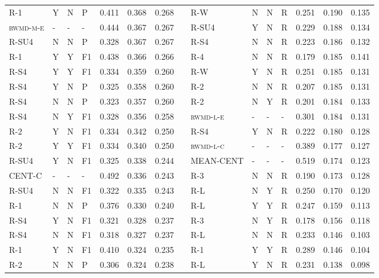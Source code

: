 \documentclass[11pt,a4paper]{article}
\begin{document}
\begin{table}[]
{\begin{tabular}{lllllllllllllll}
\textsc{R-1} & Y & N & P & 0.411 & 0.368 & 0.268 &  & \textsc{R-W} & N & N & R & 0.251 & 0.190 & 0.135 \\
\textsc{rwmd-m-e} & - & - & - & 0.444 & 0.367 & 0.267 &  & \textsc{R-SU4} & Y & N & R & 0.229 & 0.188 & 0.134 \\
\textsc{R-SU4} & N & N & P & 0.328 & 0.367 & 0.267 &  & \textsc{R-S4} & N & N & R & 0.223 & 0.186 & 0.132 \\
\textsc{R-1} & Y & Y & F1 & 0.438 & 0.366 & 0.266 &  & \textsc{R-4} & N & N & R & 0.179 & 0.185 & 0.141 \\
\textsc{R-S4} & Y & Y & F1 & 0.334 & 0.359 & 0.260 &  & \textsc{R-W} & Y & N & R & 0.251 & 0.185 & 0.131 \\
\textsc{R-S4} & Y & N & P & 0.325 & 0.358 & 0.260 &  & \textsc{R-2} & N & N & R & 0.207 & 0.185 & 0.131 \\
\textsc{R-S4} & N & N & P & 0.323 & 0.357 & 0.260 &  & \textsc{R-2} & N & Y & R & 0.201 & 0.184 & 0.133 \\
\textsc{R-S4} & N & Y & F1 & 0.328 & 0.356 & 0.258 &  & \textsc{rwmd-l-e} & - & - & - & 0.301 & 0.184 & 0.131 \\
\textsc{R-2} & Y & N & F1 & 0.334 & 0.342 & 0.250 &  & \textsc{R-S4} & Y & N & R & 0.222 & 0.180 & 0.128 \\
\textsc{R-2} & Y & Y & F1 & 0.334 & 0.340 & 0.250 &  & \textsc{rwmd-l-c} & - & - & - & 0.389 & 0.177 & 0.127 \\
\textsc{R-SU4} & Y & N & F1 & 0.325 & 0.338 & 0.244 &  & \textsc{MEAN-CENT} & - & - & - & 0.519 & 0.174 & 0.123 \\
\textsc{CENT-C} & - & - & - & 0.492 & 0.336 & 0.243 &  & \textsc{R-3} & N & N & R & 0.190 & 0.173 & 0.128 \\
\textsc{R-SU4} & N & N & F1 & 0.322 & 0.335 & 0.243 &  & \textsc{R-L} & N & Y & R & 0.250 & 0.170 & 0.120 \\
\textsc{R-1} & N & N & P & 0.376 & 0.330 & 0.240 &  & \textsc{R-L} & Y & Y & R & 0.247 & 0.159 & 0.113 \\
\textsc{R-S4} & Y & N & F1 & 0.321 & 0.328 & 0.237 &  & \textsc{R-3} & N & Y & R & 0.178 & 0.156 & 0.118 \\
\textsc{R-S4} & N & N & F1 & 0.318 & 0.327 & 0.237 &  & \textsc{R-L} & N & N & R & 0.233 & 0.146 & 0.103 \\
\textsc{R-1} & Y & N & F1 & 0.410 & 0.324 & 0.235 &  & \textsc{R-1} & Y & Y & R & 0.289 & 0.146 & 0.104 \\
\textsc{R-2} & N & N & P & 0.306 & 0.324 & 0.238 &  & \textsc{R-L} & Y & N & R & 0.231 & 0.138 & 0.098 \\

\end{tabular}}
\end{table}
\end{document}
